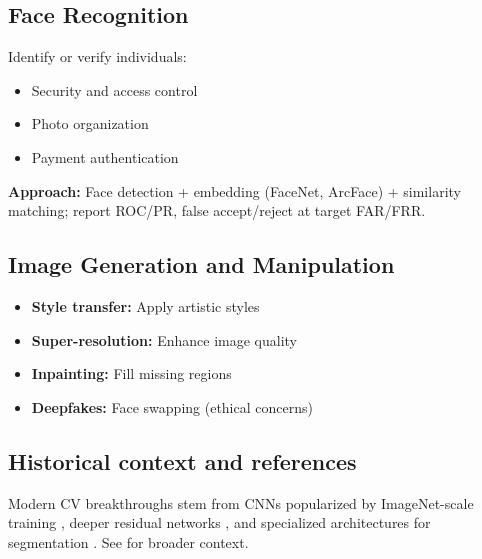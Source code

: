 \subsection{Face Recognition}

Identify or verify individuals:
\begin{itemize}
    \item Security and access control
    \item Photo organization
    \item Payment authentication
\end{itemize}

\textbf{Approach:} Face detection + embedding (FaceNet, ArcFace) + similarity matching; report ROC/PR, false accept/reject at target FAR/FRR.

\subsection{Image Generation and Manipulation}

\begin{itemize}
    \item \textbf{Style transfer:} Apply artistic styles
    \item \textbf{Super-resolution:} Enhance image quality
    \item \textbf{Inpainting:} Fill missing regions
    \item \textbf{Deepfakes:} Face swapping (ethical concerns)
\end{itemize}

\subsection{Historical context and references}

Modern CV breakthroughs stem from CNNs popularized by ImageNet-scale training \textcite{Krizhevsky2012}, deeper residual networks \textcite{He2016}, and specialized architectures for segmentation \textcite{Ronneberger2015}. See \textcite{GoodfellowEtAl2016,Prince2023} for broader context.

